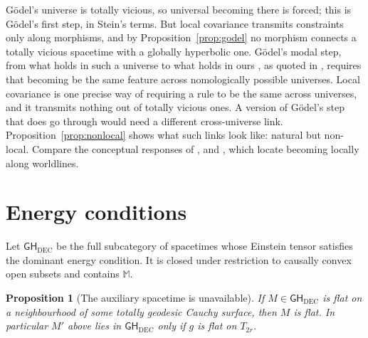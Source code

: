 \documentclass[11pt]{article}
\newtheorem{proposition}[theorem]{Proposition}
\theoremstyle{definition}
\newcommand{\GH}{\mathsf{GH}}
\newcommand{\Mink}{\mathbb M}
\begin{document}
Gödel's universe is totally vicious, so universal becoming there is forced;
this is Gödel's first step, in Stein's terms. But local covariance transmits
constraints only along morphisms, and by Proposition~\ref{prop:godel} no
morphism connects a totally vicious spacetime with a globally hyperbolic one. Gödel's modal step, from what holds
in such a universe to what holds in ours \citep[pp.~561--562]{Godel1949}, as
quoted in \citep[\S6]{Monton2006}, requires that becoming be the same
feature across nomologically possible universes. Local covariance is one
precise way of requiring a rule to be the same across universes, and it
transmits nothing out of totally vicious ones. A version of Gödel's step that does go through
would need a different cross-universe link. Proposition~\ref{prop:nonlocal} shows what such links
look like: natural but non-local. Compare the conceptual responses of
\citet{Savitt2005}, \citet{Dieks2006} and \citet{Aames2022}, which locate
becoming locally along worldlines.

\section{Energy conditions}\label{sec:energy}

Let $\GH_{\mathrm{DEC}}$ be the full subcategory of spacetimes whose Einstein
tensor satisfies the dominant energy condition. It is closed under restriction
to causally convex open subsets and contains $\Mink$.

\begin{proposition}[The auxiliary spacetime is unavailable]\label{prop:dec}
If $M\in\GH_{\mathrm{DEC}}$ is flat on a neighbourhood of some totally geodesic
Cauchy surface, then $M$ is flat. In particular $M'$ above lies in $\GH_{\mathrm{DEC}}$ only if
$g$ is flat on $T_{2r}$.
\end{proposition}
\end{document}
